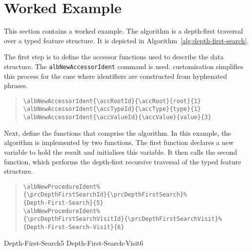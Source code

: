 \documentclass[11pt,a4paper,oneside,titlepage]{alb-latex}
\begin{document}

\section{Worked Example}
\label{sec:alb-algorithms-documentation:worked-example}

This section contains a worked example.  The algorithm is a depth-first
traversal over a typed feature structure.  It is depicted in
Algorithm~\ref{alg:depth-first-search}.

The first step is to define the accessor functions used to describe the
data structure.  The \texttt{albNewAccessorIdent} command is used.
\AUCTeX{} customisation simplifies this process for the case where
identifiers are constructed from hyphenated phrases.

\begin{quote}
\begin{verbatim}
\albNewAccessorIdent{\accRootId}{\accRoot}{root}{1}
\albNewAccessorIdent{\accTypeId}{\accType}{type}{1}
\albNewAccessorIdent{\accValueId}{\accValue}{value}{3}
\end{verbatim}
\end{quote}


Next, define the functions that comprise the algorithm.  In this
example, the algorithm is implemented by two functions.  The first
function declares a new variable to hold the result and initialises this
variable.  It then calls the second function, which performs the
depth-first recursive traversal of the typed feature structure.

\begin{quote}
\begin{verbatim}
\albNewProcedureIdent%
{\prcDepthFirstSearchId}{\prcDepthFirstSearch}%
{Depth-First-Search}{5}
\albNewProcedureIdent%
{\prcDepthFirstSearchVisitId}{\prcDepthFirstSearchVisit}%
{Depth-First-Search-Visit}{6}
\end{verbatim}
\end{quote}

\albNewProcedureIdent%
{\prcDepthFirstSearchId}{\prcDepthFirstSearch}%
{Depth-First-Search}{5}
\albNewProcedureIdent%
{\prcDepthFirstSearchVisitId}{\prcDepthFirstSearchVisit}%
{Depth-First-Search-Visit}{6}
\end{document}
